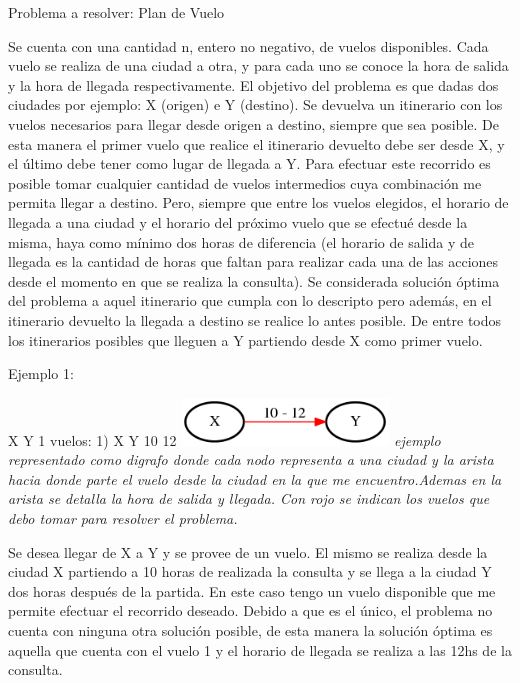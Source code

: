 \documentclass{article}
\begin{document}
{\noindent \Huge Problema a resolver: Plan de Vuelo}\newline  \newline

Se cuenta con una cantidad n, entero no negativo, de vuelos disponibles. Cada vuelo se realiza de una ciudad a otra, y para cada uno se conoce la hora de salida y la hora de llegada respectivamente.
 El objetivo del problema es que dadas dos ciudades por ejemplo: X (origen) e  Y (destino).  Se devuelva un itinerario con los vuelos necesarios para llegar desde origen a destino, siempre que sea posible.  De esta manera el primer vuelo que realice el itinerario devuelto debe ser desde X, y el último debe tener como lugar de llegada a Y. Para efectuar este recorrido es posible tomar cualquier cantidad de vuelos intermedios cuya combinación me permita llegar a destino. Pero, siempre que entre los vuelos elegidos, el horario de  llegada a una ciudad y el horario del próximo vuelo que se efectué  desde la misma, haya como mínimo dos horas de diferencia (el horario de salida y de llegada es la cantidad de horas que faltan para realizar cada una de las acciones desde el momento en que se realiza la consulta). 
Se considerada solución óptima del problema a aquel itinerario que cumpla con lo descripto pero además, en el itinerario devuelto la llegada a destino se realice lo antes posible. De entre todos los itinerarios posibles que lleguen a Y partiendo desde X como primer vuelo.\newline

Ejemplo 1:

X Y 1
vuelos:
1) X Y 10 12\newline
\vspace{1cm}
\includegraphics[width=\textwidth,height=0.5in,keepaspectratio
]{ejemplo1.png}\newline
\textit{ejemplo representado como digrafo donde cada nodo representa a una ciudad y la arista hacia donde parte el vuelo desde la ciudad en la que me encuentro.Ademas en la arista se detalla la hora de salida y llegada. Con rojo se indican los vuelos que debo tomar para resolver el problema.} \newline

Se desea llegar de X a Y y se provee de un vuelo. El mismo se realiza desde la ciudad X partiendo a 10 horas de realizada la consulta y se llega a la ciudad Y dos horas después de la partida. En este caso tengo un vuelo disponible que me permite efectuar el recorrido deseado. Debido  a que es el único, el problema no cuenta con ninguna otra solución posible, de esta manera la solución óptima es aquella que cuenta con el vuelo 1 y el horario de llegada se realiza a las 12hs de la consulta.\newline \newline
\end{document}
